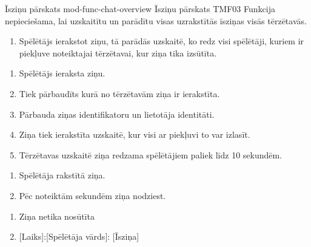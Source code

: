 \moduleFunctionTable
{Īsziņu pārskats}
{mod-func-chat-overview}
{Īsziņu pārskats}
{TMF03}
{
	Funkcija nepieciešama, lai uzskaitītu un parādītu visas uzrakstītās īsziņas visās tērzētavās.
}
{
	\begin{enumerate}
		\item Spēlētājs ierakstot ziņu, tā parādās uzskaitē, ko redz visi spēlētāji, kuriem ir piekļuve noteiktajai tērzētavai, kur ziņa tika izsūtīta.
	\end{enumerate}
}
{
	\begin{enumerate}
		\item Spēlētājs ieraksta ziņu.
		\item Tiek pārbaudīts kurā no tērzētavām ziņa ir ierakstīta.
		\item Pārbauda ziņas identifikatoru un lietotāja identitāti.
		\item Ziņa tiek ierakstīta uzskaitē, kur visi ar piekļuvi to var izlasīt.
		\item Tērzētavas uzskaitē ziņa redzama spēlētājiem paliek līdz 10 sekundēm.
	\end{enumerate}
}
{
	\begin{enumerate}
		\item Spēlētāja rakstītā ziņa.
		\item Pēc noteiktām sekundēm ziņa nodziest.
	\end{enumerate}
}
{
	\begin{enumerate}
		\item Ziņa netika nosūtīta
		\item {}[Laiks]:[Spēlētāja vārds]: [Īsziņa]
	\end{enumerate}
}

